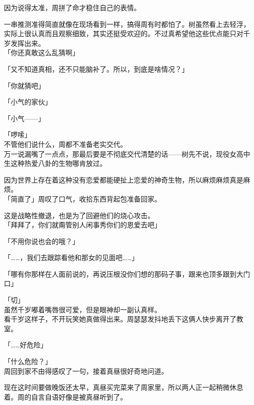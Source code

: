 因为说得太准，周拼了命才稳住自己的表情。

一串推测准得简直就像在现场看到一样，搞得周有时都怕了。树虽然看上去轻浮，实际上很认真而且观察细致，其实还挺受欢迎的。不过真希望他这些优点能只对千岁发挥出来。\\

「你还真敢这么乱猜啊」

「又不知道真相，还不只能脑补了。所以，到底是啥情况？」

「你就猜吧」

「小气的家伙」

「小气——」

「啰嗦」\\

不管他们说什么，周都不准备老实交代。\\

万一说漏嘴了一点点，那最后要是不彻底交代清楚的话——树先不说，现役女高中生这种热爱八卦的生物哪肯放过。

因为世界上存在着这种没有恋爱都能硬扯上恋爱的神奇生物，所以麻烦麻烦真是麻烦。\\

「简直了」周叹了口气，收拾东西背起包准备回家。

这是战略性撤退，也是为了回避他们的烧心攻击。\\

「拜拜了，你们就甭管别人闲事秀你们的恩爱去吧」

「不用你说也会的哦？」

「……，我们去跟踪看他和那女的见面吧……」

「哪有你那样在人面前说的，再说压根没你们想的那码子事，跟来也顶多跟到大门口」

「切」\\

虽然千岁嘟着嘴唇很可爱，但是眼神却一副认真样。\\

看千岁这样子，不开玩笑她真做得出来。周瑟瑟发抖地丢下这俩人快步离开了教室。\\

\vspace{2\baselineskip}

「……好危险」

「什么危险？」\\

周回到家不由得感叹了一句，接着真昼很好奇地问道。

现在这时间要做晚饭还太早，真昼买完菜来了周家里，所以两人正一起稍微休息着。周的自言自语好像是被真昼听到了。\\

